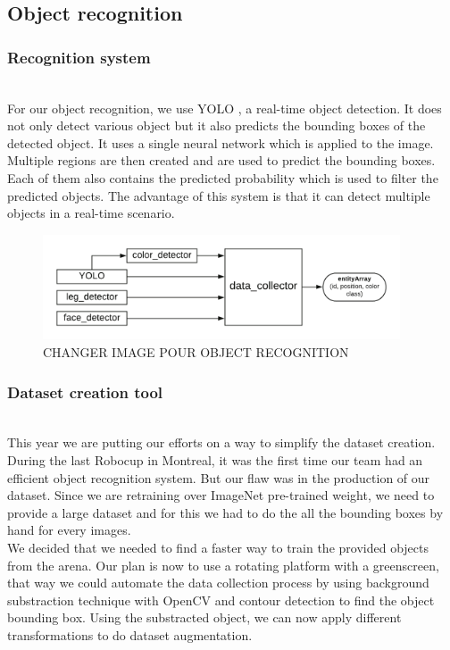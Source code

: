 \documentclass[runningheads,a4paper]{llncs}
\begin{document}
\subsection{Object recognition}
\subsubsection{Recognition system}
\hfill\\

For our object recognition, we use YOLO \cite{yolo}, a real-time object detection. It does not only detect various object but it also predicts the bounding boxes of the detected object. It uses a single neural network which is applied to the image. Multiple regions are then created and are used to predict the bounding boxes. Each of them also contains the predicted probability which is used to filter the predicted objects. The advantage of this system is that it can detect multiple objects in a real-time scenario.\\

\begin{figure}
  \centering
  \includegraphics[width=300pt]{images/wm_data_collector.png}
  \caption{ CHANGER IMAGE POUR OBJECT RECOGNITION}
\end{figure} 

\subsubsection{Dataset creation tool}
\hfill\\

This year we are putting our efforts on a way to simplify the dataset creation. During the last Robocup in Montreal, it was the first time our team had an efficient object recognition system. But our flaw was in the production of our dataset. Since we are retraining over ImageNet pre-trained weight, we need to provide a large dataset and for this we had to do the all the bounding boxes by hand for every images.\\
 
We decided that we needed to find a faster way to train the provided objects from the arena. Our plan is now to use a rotating platform with a greenscreen, that way we could automate the data collection process by using background substraction technique with OpenCV and contour detection to find the object bounding box. Using the substracted object, we can now apply different transformations to do dataset augmentation. \\
\end{document}
